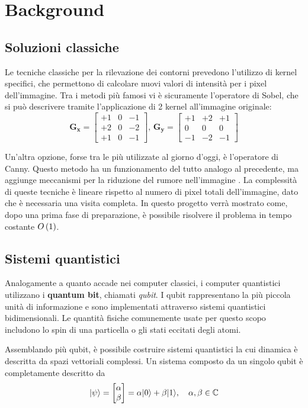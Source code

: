 \section{Background}\label{sec:background}

\subsection{Soluzioni classiche}
Le tecniche classiche per la rilevazione dei contorni prevedono l'utilizzo di 
kernel specifici, che permettono di calcolare nuovi valori di intensità per i pixel 
dell'immagine. Tra i metodi più famosi vi è sicuramente l'operatore di Sobel, 
che si può descrivere tramite l'applicazione di 2 kernel all'immagine originale:
\[
\mathbf{G_x} =
\begin{bmatrix}
+1 & 0 & -1 \\
+2 & 0 & -2 \\
+1 & 0 & -1
\end{bmatrix}
, \, 
\mathbf{G_y} =
\begin{bmatrix}
+1 & +2 & +1 \\
0 & 0 & 0 \\
-1 & -2 & -1
\end{bmatrix}
\]

Un'altra opzione, forse tra le più utilizzate al giorno d'oggi, è l'operatore di
Canny. Questo metodo ha un funzionamento del tutto analogo al precedente, ma
aggiunge meccanismi per la riduzione del rumore nell'immagine
\cite{digital_image_processing}. La complessità di queste tecniche è lineare
rispetto al numero di pixel totali dell'immagine, dato che è necessaria una
visita completa. In questo progetto verrà mostrato come, dopo una prima fase di
preparazione, è possibile risolvere il problema in tempo costante $O\left({1}\right)$.

\subsection{Sistemi quantistici}

Analogamente a quanto accade nei computer classici, i computer quantistici utilizzano i \textbf{quantum bit}, chiamati \emph{qubit}. I qubit rappresentano la più piccola unità di informazione e sono implementati attraverso sistemi quantistici bidimensionali. Le quantità fisiche comunemente usate per questo scopo includono lo spin di una particella o gli stati eccitati degli atomi.

Assemblando più qubit, è possibile costruire sistemi quantistici la cui dinamica è descritta da spazi vettoriali complessi. Un sistema composto da un singolo qubit è completamente descritto da
\begin{equation}
	\lvert\psi\rangle = \begin{bmatrix}
		\alpha\\ \beta
	\end{bmatrix} = \alpha \lvert0\rangle + \beta \lvert1\rangle,\quad \alpha,\beta \in
	\mathbb{C}
	\label{eq:1-qubit-state}
\end{equation}

